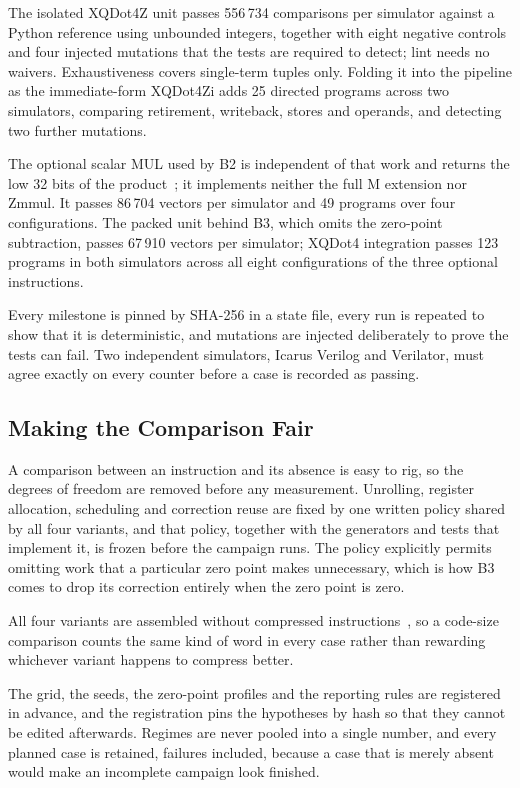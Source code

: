 The isolated XQDot4Z unit passes 556\,734 comparisons per simulator against a
Python reference using unbounded integers, together with eight negative
controls and four injected mutations that the tests are required to detect;
lint needs no waivers. Exhaustiveness covers single-term tuples only. Folding
it into the pipeline as the immediate-form XQDot4Zi adds 25 directed programs
across two simulators, comparing retirement, writeback, stores and operands,
and detecting two further mutations.

The optional scalar MUL used by B2 is independent of that work and returns the
low 32 bits of the product~\cite{riscvm}; it implements neither the full M
extension nor Zmmul. It passes 86\,704 vectors per simulator and 49 programs
over four configurations. The packed unit behind B3, which omits the zero-point
subtraction, passes 67\,910 vectors per simulator; XQDot4 integration passes
123 programs in both simulators across all eight configurations of the three
optional instructions.

Every milestone is pinned by SHA-256 in a state file, every run is repeated to
show that it is deterministic, and mutations are injected deliberately to prove
the tests can fail. Two independent simulators, Icarus Verilog and Verilator,
must agree exactly on every counter before a case is recorded as passing.

\subsection{Making the Comparison Fair}
A comparison between an instruction and its absence is easy to rig, so the
degrees of freedom are removed before any measurement. Unrolling, register
allocation, scheduling and correction reuse are fixed by one written policy
shared by all four variants, and that policy, together with the generators and
tests that implement it, is frozen before the campaign runs. The policy
explicitly permits omitting work that a particular zero point makes
unnecessary, which is how B3 comes to drop its correction entirely when the
zero point is zero.

All four variants are assembled without compressed
instructions~\cite{riscvc}, so a code-size comparison counts the same kind of
word in every case rather than rewarding whichever variant happens to compress
better.

The grid, the seeds, the zero-point profiles and the reporting rules are
registered in advance, and the registration pins the hypotheses by hash so that
they cannot be edited afterwards. Regimes are never pooled into a single
number, and every planned case is retained, failures included, because a case
that is merely absent would make an incomplete campaign look finished.


